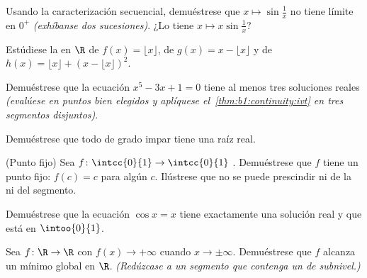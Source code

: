 \begin{exercise}[$\star$]\label{exo:b1:continuity:1}
Usando la caracterización secuencial, demuéstrese que
$x \mapsto \sin\frac 1x$ no tiene límite en $0^+$ \emph{(exhíbanse dos
sucesiones)}. ¿Lo tiene $x \mapsto x \sin\frac 1x$?
\end{exercise}

\begin{exercise}[$\star$]\label{exo:b1:continuity:2}
Estúdiese la  en $\R$ de $f(x) = \lfloor x \rfloor$, de
$g(x) = x - \lfloor x \rfloor$ y de
$h(x) = \lfloor x \rfloor + (x - \lfloor x\rfloor)^2$.
\end{exercise}

\begin{exercise}[$\star$]\label{exo:b1:continuity:3}
Demuéstrese que la ecuación $x^5 - 3x + 1 = 0$ tiene al menos tres
soluciones reales \emph{(evalúese en puntos bien elegidos y aplíquese
el~\cref{thm:b1:continuity:ivt} en tres segmentos disjuntos)}.
\end{exercise}

\begin{exercise}[$\star$]\label{exo:b1:continuity:4}
Demuéstrese que todo  de grado impar tiene una raíz real.
\end{exercise}

\begin{exercise}[$\star\star$]\label{exo:b1:continuity:5}
(Punto fijo) Sea $f \colon \intcc{0}{1} \to \intcc{0}{1}$
. Demuéstrese que $f$ tiene un punto fijo: $f(c) = c$ para
algún $c$. Ilústrese que no se puede prescindir ni de la
 ni del segmento.
\end{exercise}

\begin{exercise}[$\star\star$]\label{exo:b1:continuity:6}
Demuéstrese que la ecuación $\cos x = x$ tiene exactamente una
solución real y que está en $\intoo{0}{1}$.
\end{exercise}

\begin{exercise}[$\star\star$]\label{exo:b1:continuity:7}
Sea $f \colon \R \to \R$  con $f(x) \to +\infty$ cuando
$x \to \pm\infty$. Demuéstrese que $f$ alcanza un mínimo global en
$\R$. \emph{(Redúzcase a un segmento que contenga un  de subnivel.)}
\end{exercise}

